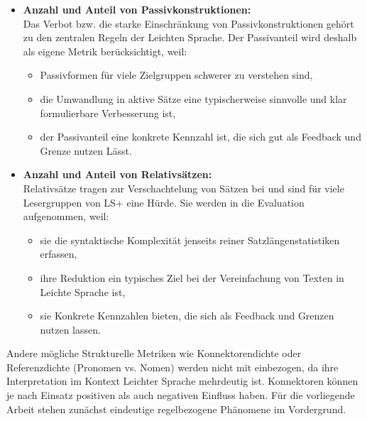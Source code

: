 \begin{itemize}
	\item \textbf{Anzahl und Anteil von Passivkonstruktionen:}\\
	Das Verbot bzw. die starke Einschränkung von Passivkonstruktionen gehört zu den zentralen Regeln der Leichten Sprache.
	Der Passivanteil wird deshalb als eigene Metrik berücksichtigt, weil:
	\begin{itemize}
		\item Passivformen für viele Zielgruppen schwerer zu verstehen sind,
		\item die Umwandlung in aktive Sätze eine typischerweise sinnvolle und klar formulierbare Verbesserung ist,
		\item der Passivanteil eine konkrete Kennzahl ist, die sich gut als Feedback und Grenze nutzen Lässt.
	\end{itemize}
	\item \textbf{Anzahl und Anteil von Relativsätzen:}\\
	Relativsätze tragen zur Verschachtelung von Sätzen bei und sind für viele Lesergruppen von LS+ eine Hürde.
	Sie werden in die Evaluation aufgenommen, weil:
	\begin{itemize}
		\item sie die syntaktische Komplexität jenseits reiner Satzlängenstatistiken erfassen,
		\item ihre Reduktion ein typisches Ziel bei der Vereinfachung von Texten in Leichte Sprache ist,
		\item sie Konkrete Kennzahlen bieten, die sich als Feedback und Grenzen nutzen lassen.
	\end{itemize}
\end{itemize}
Andere mögliche Strukturelle Metriken wie Konnektorendichte oder Referenzdichte (Pronomen vs. Nomen) werden nicht mit einbezogen, da ihre Interpretation im Kontext Leichter Sprache mehrdeutig ist.
Konnektoren können je nach Einsatz positiven als auch negativen Einfluss haben.
Für die vorliegende Arbeit stehen zunächst eindeutige regelbezogene Phänomene im Vordergrund.

